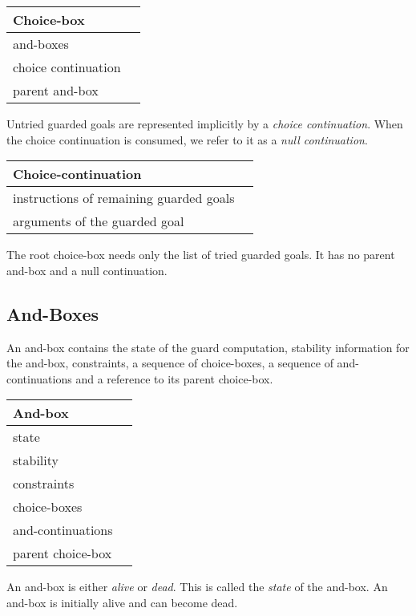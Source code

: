 \begin{center} \begin{tabular}{|l|l|} \hline
Choice-box \\
\hline
\hline
and-boxes \\
choice continuation \\
parent and-box\\
\hline
\end{tabular} \end{center}

Untried guarded goals are represented implicitly by a {\em choice
continuation}. When the choice continuation is consumed, we refer to
it as a {\em null continuation}.

\begin{center} \begin{tabular}{|l|l|} \hline
Choice-continuation\\
\hline
\hline
instructions of remaining guarded goals\\
arguments of the guarded goal \\
\hline
\end{tabular} \end{center}

The root choice-box needs only the list of tried guarded goals. It has
no parent and-box and a null continuation.

\subsection*{And-Boxes}

An and-box contains the state of the guard computation, stability
information for the and-box, constraints, a sequence of choice-boxes,
a sequence of and-continuations and a reference to its parent
choice-box.

\medskip
\begin{center} \begin{tabular}{|l|l|} \hline
And-box \\
\hline
\hline
state\\
stability\\
constraints \\
choice-boxes \\
and-continuations \\
parent choice-box \\
\hline
\end{tabular} \end{center}

An and-box is either {\em alive} or {\em dead}. This is called the
{\em state} of the and-box.  An and-box is initially alive and can
become dead.


